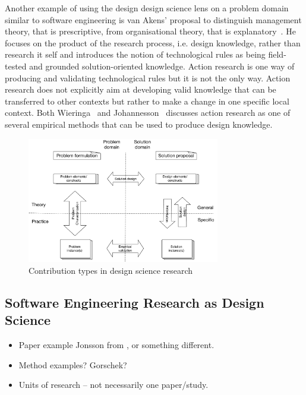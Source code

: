 \documentclass[graybox]{svmult}
\begin{document}

Another example of using the design design science lens on a problem domain similar to software engineering is van Akens' proposal to distinguish management theory, that is prescriptive, from organisational theory, that is explanatory~\cite{van_aken_management_2005}. He focuses on the product of the research process, i.e. design knowledge, rather than research it self and introduces the notion of technological rules as being field-tested and grounded solution-oriented knowledge. Action research is one way of producing and validating technological rules but it is not the only way. Action research does not explicitly aim at developing valid knowledge that can be transferred to other contexts but rather to make a change in one specific local context. Both Wieringa~\cite{wieringa_technical_2012} and Johannesson~\cite{johannesson_introduction_2014} discusses action research as one of several empirical methods that can be used to produce design knowledge.


\begin{figure}
  \includegraphics[width=0.75\textwidth]{Figures/DS_model.pdf}
\caption{Contribution types in design science research}
\label{fig:contributiontypes}       %
\end{figure}



\subsection{Software Engineering Research as Design Science}
\begin{itemize}
\item Paper example Jonsson \cite{JonssonBug15} from \cite{StoreyESEM17}, or something different.
\item Method examples? Gorschek? \cite{GorschekSW2006}
\item Units of research -- not necessarily one paper/study.
\end{itemize}
\end{document}
